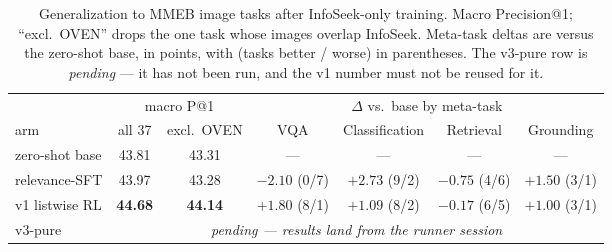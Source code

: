 \begin{table}[t]
\centering\small
\caption{Generalization to MMEB image tasks after InfoSeek-only training. Macro Precision@1;
``excl.\ OVEN'' drops the one task whose images overlap InfoSeek. Meta-task deltas are versus the
zero-shot base, in points, with (tasks better / worse) in parentheses. The v3-pure row is
\emph{pending} --- it has not been run, and the v1 number must not be reused for it.}
\label{tab:mm_mmeb}
\begin{tabular}{lcccccc}
\toprule
& \multicolumn{2}{c}{macro P@1} & \multicolumn{4}{c}{$\Delta$ vs.\ base by meta-task} \\
\cmidrule(lr){2-3}\cmidrule(lr){4-7}
arm & all 37 & excl.\ OVEN & VQA & Classification & Retrieval & Grounding \\
\midrule
zero-shot base   & 43.81 & 43.31 & --- & --- & --- & --- \\
relevance-SFT    & 43.97 & 43.28 & $-2.10$ (0/7) & $+2.73$ (9/2) & $-0.75$ (4/6) & $+1.50$ (3/1) \\
v1 listwise RL   & \textbf{44.68} & \textbf{44.14} & $\mathbf{+1.80}$ (8/1) & $+1.09$ (8/2) & $-0.17$ (6/5) & $+1.00$ (3/1) \\
v3-pure          & \multicolumn{6}{c}{\emph{pending --- results land from the runner session}} \\
\bottomrule
\end{tabular}
\end{table}

